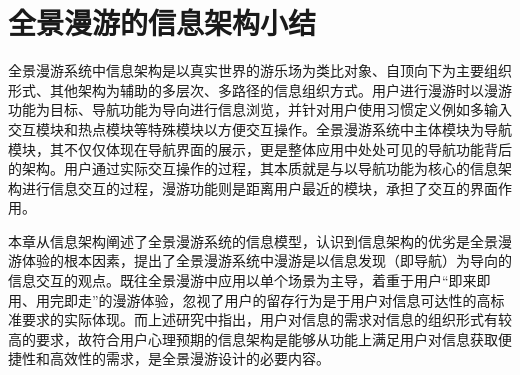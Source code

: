 \section{全景漫游的信息架构小结}
全景漫游系统中信息架构是以真实世界的游乐场为类比对象、自顶向下为主要组织形式、其他架构为辅助的多层次、多路径的信息组织方式。用户进行漫游时以漫游功能为目标、导航功能为导向进行信息浏览，并针对用户使用习惯定义例如多输入交互模块和热点模块等特殊模块以方便交互操作。全景漫游系统中主体模块为导航模块，其不仅仅体现在导航界面的展示，更是整体应用中处处可见的导航功能背后的架构。用户通过实际交互操作的过程，其本质就是与以导航功能为核心的信息架构进行信息交互的过程，漫游功能则是距离用户最近的模块，承担了交互的界面作用。

本章从信息架构阐述了全景漫游系统的信息模型，认识到信息架构的优劣是全景漫游体验的根本因素，提出了全景漫游系统中漫游是以信息发现（即导航）为导向的信息交互的观点。既往全景漫游中应用以单个场景为主导，着重于用户“即来即用、用完即走”的漫游体验，忽视了用户的留存行为是于用户对信息可达性的高标准要求的实际体现。而上述研究中指出，用户对信息的需求对信息的组织形式有较高的要求，故符合用户心理预期的信息架构是能够从功能上满足用户对信息获取便捷性和高效性的需求，是全景漫游设计的必要内容。
